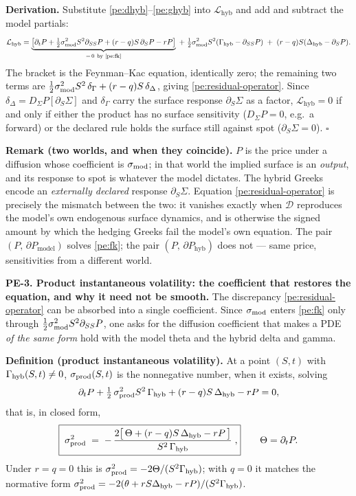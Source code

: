 \textbf{Derivation.} Substitute \eqref{pe:dhyb}--\eqref{pe:ghyb} into
$\mathcal{L}_{\mathrm{hyb}}$ and add and subtract the model partials:
\[
  \mathcal{L}_{\mathrm{hyb}}
  = \underbrace{\bigl[\partial_t P + \tfrac12\sigma_{\mathrm{mod}}^2S^2\partial_{SS}P
     + (r-q)S\,\partial_S P - rP\bigr]}_{=\,0\ \text{by \eqref{pe:fk}}}
  \;+\; \tfrac12\sigma_{\mathrm{mod}}^2 S^2(\Gamma_{\mathrm{hyb}}-\partial_{SS}P)
  \;+\; (r-q)S(\Delta_{\mathrm{hyb}}-\partial_S P).
\]
The bracket is the Feynman--Kac equation, identically zero; the remaining two
terms are $\tfrac12\sigma_{\mathrm{mod}}^2S^2\,\delta_\Gamma + (r-q)S\,\delta_\Delta$, giving
\eqref{pe:residual-operator}. Since $\delta_\Delta = D_\Sigma P[\partial_S\Sigma]$
and $\delta_\Gamma$ carry the surface response $\partial_S\Sigma$ as a factor,
$\mathcal{L}_{\mathrm{hyb}} = 0$ if and only if either the product has no
surface sensitivity ($D_\Sigma P = 0$, e.g.\ a forward) or the declared rule
holds the surface still against spot ($\partial_S\Sigma = 0$). $\square$

\textbf{Remark (two worlds, and when they coincide).} $P$ is the price under a
diffusion whose coefficient is $\sigma_{\mathrm{mod}}$; in that world the implied surface is an
\emph{output}, and its response to spot is whatever the model dictates. The
hybrid Greeks encode an \emph{externally declared} response $\partial_S\Sigma$.
Equation \eqref{pe:residual-operator} is precisely the mismatch between the two:
it vanishes exactly when $\mathcal{D}$ reproduces the model's own endogenous
surface dynamics, and is otherwise the signed amount by which the hedging
Greeks fail the model's own equation. The pair $(P,\,\partial P_{\mathrm{model}})$
solves \eqref{pe:fk}; the pair $(P,\,\partial P_{\mathrm{hyb}})$ does not ---
same price, sensitivities from a different world.

\textbf{PE-3. Product instantaneous volatility: the coefficient
that restores the equation, and why it need not be smooth.} The discrepancy
\eqref{pe:residual-operator} can be absorbed into a single coefficient. Since
$\sigma_{\mathrm{mod}}$ enters \eqref{pe:fk} only through $\tfrac12\sigma_{\mathrm{mod}}^2S^2\partial_{SS}P$,
one asks for the diffusion coefficient that makes a PDE \emph{of the same form}
hold with the model theta and the hybrid delta and gamma.

\textbf{Definition (product instantaneous volatility).} At a point $(S,t)$ with
$\Gamma_{\mathrm{hyb}}(S,t)\neq 0$, $\sigma_{\mathrm{prod}}(S,t)$ is the nonnegative number, when it exists,
solving
\begin{equation}\label{pe:sprod-pde}
  \partial_t P + \tfrac12\,\sigma_{\mathrm{prod}}^2 S^2\,\Gamma_{\mathrm{hyb}} + (r-q)S\,\Delta_{\mathrm{hyb}} - rP = 0 ,
\end{equation}
that is, in closed form,
\begin{equation}\label{pe:sprod}
  \boxed{\;
  \sigma_{\mathrm{prod}}^2 \;=\; -\,\frac{2\bigl[\,\Theta + (r-q)S\,\Delta_{\mathrm{hyb}} - rP\,\bigr]}{S^2\,\Gamma_{\mathrm{hyb}}}
  \;,}\qquad \Theta = \partial_t P .
\end{equation}
Under $r=q=0$ this is $\sigma_{\mathrm{prod}}^2 = -2\Theta/(S^2\Gamma_{\mathrm{hyb}})$; with $q=0$ it matches
the normative form $\sigma_{\mathrm{prod}}^2 = -2(\theta + rS\Delta_{\mathrm{hyb}} - rP)/(S^2\Gamma_{\mathrm{hyb}})$.

